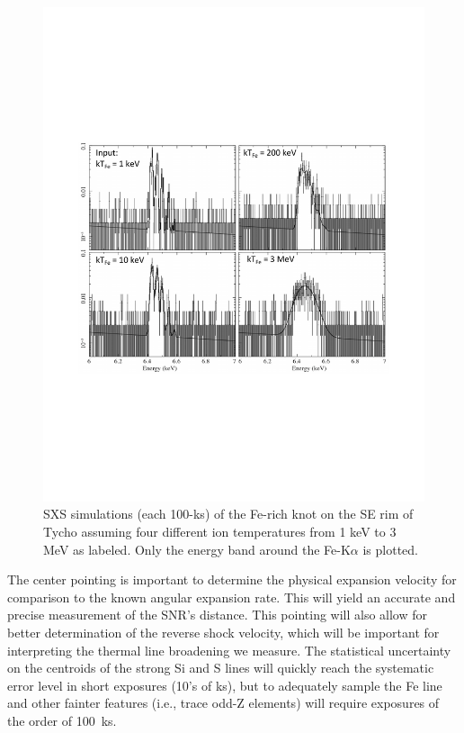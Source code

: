 \documentclass[11pt,a4paper]{article}
\begin{document}
{\begin{figure}
  \begin{center}
    \vspace{-0.25in}
    \includegraphics[width=5.5in,clip,trim=55 205 55 215]{tycho100ks-FeknotWidth}
  \caption{ SXS simulations (each 100-ks) of the Fe-rich knot on the
    SE rim of Tycho assuming four different ion temperatures from 1
    keV to 3 MeV as labeled. Only the energy band around the Fe-K$\alpha$ 
    is plotted.}
  \label{tycho:seknot}
  \end{center}
\end{figure}

The center pointing is important to determine the physical expansion
velocity for comparison to the known angular expansion rate.  This
will yield an accurate and precise measurement of the SNR's
distance. This pointing will also allow for better determination of
the reverse shock velocity, which will be important for interpreting
the thermal line broadening we measure. The statistical uncertainty on
the centroids of the strong Si and S lines will quickly reach the
systematic error level in short exposures (10's of ks), but to
adequately sample the Fe line and other fainter features (i.e., trace
odd-Z elements) will require exposures of the order of 100~ks.

}
\end{document}
